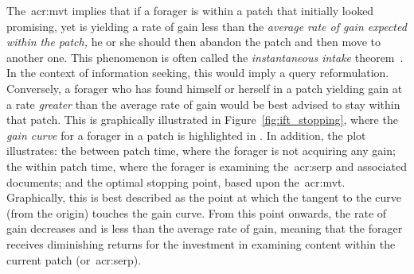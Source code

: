 The~\gls{acr:mvt} implies that if a forager is within a patch that initially looked promising, yet is yielding a rate of gain less than the \emph{average rate of gain expected within the patch,} he or she should then abandon the patch and then move to another one. This phenomenon is often called the \emph{instantaneous intake} theorem~\citep{stephens1986foraging_theory}. In the context of information seeking, this would imply a query reformulation. Conversely, a forager who has found himself or herself in a patch yielding gain at a rate \emph{greater} than the average rate of gain would be best advised to stay within that patch. This is graphically illustrated in Figure~\ref{fig:ift_stopping}, where the \emph{gain curve} for a forager in a patch is highlighted in . In addition, the plot illustrates:  the between patch time, where the forager is not acquiring any gain;  the within patch time, where the forager is examining the~\gls{acr:serp} and associated documents; and  the optimal stopping point, based upon the~\gls{acr:mvt}. Graphically, this is best described as the point at which the tangent to the curve (from the origin) touches the gain curve. From this point onwards, the rate of gain decreases and is less than the average rate of gain, meaning that the forager receives diminishing returns for the investment in examining content within the current patch (or~\gls{acr:serp}).

